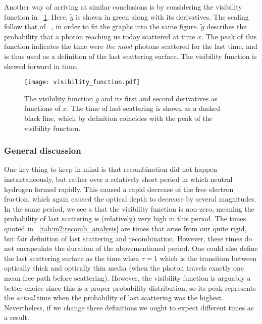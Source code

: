     Another way of arriving at similar conclusions is by considering the visibility function in ~\cref{fig:m2:visibility_function}. Here, $\tilde{g}$ is shown in green along with its derivatives. The scaling follow that of ~\cite{https://doi.org/10.48550/arxiv.astro-ph/0606683}, in order to fit the graphs into the same figure. $\tilde{g}$ describes the probability that a photon reaching us today scattered at time $x$. The peak of this function indicates the time were \textit{the most} photons scattered for the last time, and is thus used as a definition of the last scattering surface. The visibility function is skewed forward in time. 
    \begin{figure}
        \texttt{[image: visibility\_function.pdf]}
        \caption{The visibility function $\tilde{g}$ and its first and second derivatives as functions of $x$. The time of last scattering is shown as a dashed black line, which by definition coincides with the peak of the visibility function.}
        \label{fig:m2:visibility_function}
    \end{figure}

    \subsubsection{General discussion}
    One key thing to keep in mind is that recombination did not happen instantaneously, but rather over a relatively short period in which neutral hydrogen formed rapidly. This caused a rapid decrease of the free electron fraction, which again caused the optical depth to decrease by several magnitudes. In the same period, we see a that the visibility function is non-zero, meaning the probability of last scattering is (relatively) very high in this period. The times quoted in ~\cref{tab:m2:recomb_analysis} are times that arise from our quite rigid, but fair definition of last scattering and recombination. However, these times do not encapsulate the duration of the abovementioned period.  One could also define the last scattering surface as the time when $\tau=1$ which is the transition between optically thick and optically thin media (when the photon travels exactly one mean free path before scattering). However, the visibility function is arguably a better choice since this is a proper probability distribution, so its peak represents the \textit{actual} time when the probability of last scattering was the highest. Nevertheless, if we change these definitions we ought to expect different times as a result.

